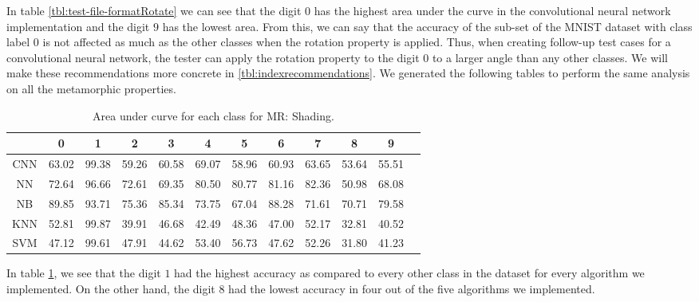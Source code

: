      In table \ref{tbl:test-file-formatRotate} we can see that the digit $0$ has the highest area under the curve in the convolutional neural network implementation and the digit $9$ has the lowest area. From this, we can say that the accuracy of the sub-set of the MNIST dataset with class label $0$ is not affected as much as the other classes when the rotation property is applied. Thus, when creating follow-up test cases for a convolutional neural network, the tester can apply the rotation property to the digit $0$ to a larger angle than any other classes. We will make these recommendations more concrete in \ref{tbl:indexrecommendations}.
     We generated the following tables to perform the same analysis on all the metamorphic properties.
    
    \begin{table}[H]
    \centering
    \begin{tabular}{|c|c|c|c|c|c|c|c|c|c|c|c|}
    \hline
     & 0 & 1 & 2 & 3 & 4 & 5 & 6 & 7 & 8 & 9 \\
    \hline
    CNN & 63.02 & \cellcolor{green!25}99.38 & 59.26 & 60.58 & 69.07 & 58.96 & 60.93 & 63.65 & \cellcolor{red!25}53.64 & 55.51 \\ 
    \hline
    NN & 72.64 & \cellcolor{green!25}96.66 & 72.61 & 69.35 & 80.50 & 80.77 & 81.16 & 82.36 & \cellcolor{red!25}50.98 & 68.08 \\
    \hline
    NB & 89.85 & \cellcolor{green!25}93.71 & 75.36 & 85.34 & 73.75 & \cellcolor{red!25}67.04 & 88.28 & 71.61 & 70.71 & 79.58 \\
    \hline
    KNN & 52.81 & \cellcolor{green!25}99.87 & 39.91 & 46.68 & 42.49 & 48.36 & 47.00 & 52.17 & \cellcolor{red!25}32.81 & 40.52 \\
    \hline
    SVM & 47.12 & \cellcolor{green!25}99.61 & 47.91 & 44.62 & 53.40 & 56.73 & 47.62 & 52.26 & \cellcolor{red!25}31.80 & 41.23 \\
    \hline
    \end{tabular}
    \caption{Area under curve for each class for MR: Shading.}
    \label{tbl:test-file-formatShade}
    \end{table}
    In table \ref{tbl:test-file-formatShade}, we see that the digit $1$ had the highest accuracy as compared to every other class in the dataset for every algorithm we implemented. On the other hand, the digit $8$ had the lowest accuracy in four out of the five algorithms we implemented.
